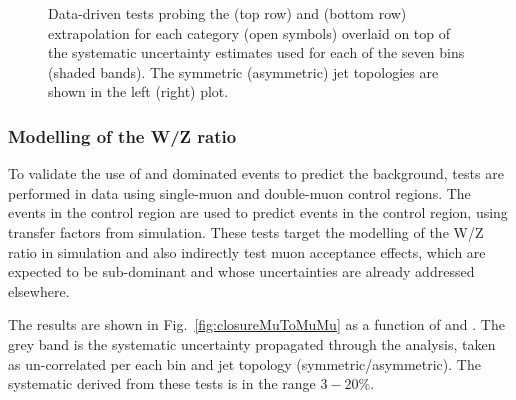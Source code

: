 \begin{figure}[h!]
\begin{center}
    \caption{Data-driven tests probing the \alphat (top row) and \bdphi (bottom row) extrapolation for each
      \njet category (open symbols) overlaid on top of the systematic
      uncertainty estimates used for each of the seven \scalht bins (shaded bands). 
      The symmetric (asymmetric) jet topologies are shown in the left (right) plot. 
    }
    \label{fig:closureAlphaT}
  \end{center} 
\end{figure}

\subsubsection*{Modelling of the W/Z ratio}
\label{sec:tfSyst_WZratio}
To validate the use of \wmj and \ttbar dominated \mj events to predict
the \znunu background, tests are performed in data using single-muon
and double-muon control regions.  The events in the \mj control region are
used to predict events in the \mmj control region, using transfer
factors from simulation.  These tests target the modelling of the W/Z
ratio in simulation and also indirectly test muon acceptance effects,
which are expected to be sub-dominant and whose uncertainties are
already addressed elsewhere.

The results are shown in Fig.~\ref{fig:closureMuToMuMu} as a function
of \scalht and \njet.  The grey band is the systematic uncertainty
propagated through the analysis, taken as un-correlated per each
\scalht bin and jet topology (symmetric/asymmetric). The systematic
derived from these tests is in the range $3-20\%$.

